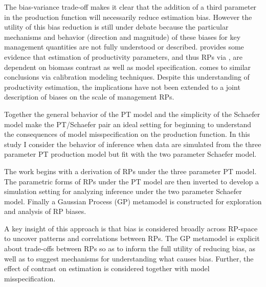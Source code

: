 \documentclass[12pt]{article}
\begin{document}
%
The bias-variance trade-off  makes it 
clear that the addition of a third parameter in the production function will 
necessarily reduce estimation bias. However the utility of this bias reduction 
is still under debate because the particular mechanisms and behavior (direction and magnitude) %
of these biases for key management quantities %
are not fully understood or described.  provides some 
evidence that estimation of productivity parameters, and thus RPs via , 
are dependent on biomass contrast as well as model specification. %
 comes to similar conclusions %
via calibration modeling techniques. Despite this understanding of productivity estimation, 
the implications have not been extended to a joint description of biases on the scale of 
management RPs. %


Together the general behavior of the PT model and the %
simplicity of the Schaefer model make the PT/Schaefer pair an ideal setting for 
beginning to understand the consequences of model misspecification on the 
production function. In this study I consider the behavior of inference when 
data are simulated from the three parameter PT production model but fit with 
the two parameter Schaefer model. 

%
The work begins with a derivation of RPs under the three parameter PT model. 
The parametric forms of RPs under the PT model are then inverted to develop a 
simulation setting for analyzing inference under the two parameter Schaefer 
model. Finally a Gaussian Process (GP) metamodel  is constructed for exploration 
and analysis of RP biases. 

%
A key insight of this approach is that bias is considered broadly across RP-space to 
uncover patterns and correlations between RPs. %
The GP metamodel is explicit about trade-offs between RPs %
so as to inform the full utility of reducing bias, as well as to suggest mechanisms for 
understanding what causes bias. Further, the effect of contrast on estimation 
is considered together with model misspecification. %
\end{document}

